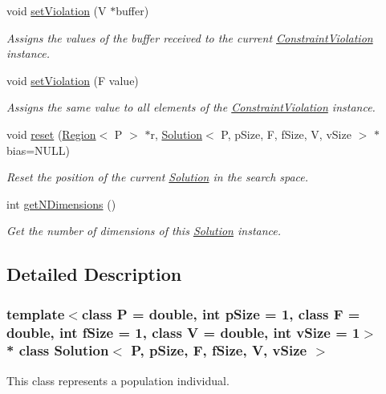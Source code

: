 \begin{DoxyCompactItemize}
void \hyperlink{classSolution_aad908f750b12ec590878684f042c23ce}{set\+Violation} (V $\ast$buffer)
\begin{DoxyCompactList}\small\item\em Assigns the values of the buffer received to the current \hyperlink{structConstraintViolation}{Constraint\+Violation} instance. \end{DoxyCompactList}\item 
void \hyperlink{classSolution_a8f2b530ec087ff9e62ef00300f6cb17e}{set\+Violation} (F value)
\begin{DoxyCompactList}\small\item\em Assigns the same value to all elements of the \hyperlink{structConstraintViolation}{Constraint\+Violation} instance. \end{DoxyCompactList}\item 
void \hyperlink{classSolution_a84c713b707a570add53e85a28196bb3e}{reset} (\hyperlink{classRegion}{Region}$<$ P $>$ $\ast$r, \hyperlink{classSolution}{Solution}$<$ P, p\+Size, F, f\+Size, V, v\+Size $>$ $\ast$bias=N\+U\+LL)
\begin{DoxyCompactList}\small\item\em Reset the position of the current \hyperlink{classSolution}{Solution} in the search space. \end{DoxyCompactList}\item 
int \hyperlink{classSolution_ad5b8c8ce272efaada80e93b0e097d1cd}{get\+N\+Dimensions} ()
\begin{DoxyCompactList}\small\item\em Get the number of dimensions of this \hyperlink{classSolution}{Solution} instance. \end{DoxyCompactList}\end{DoxyCompactItemize}


\subsection{Detailed Description}
\subsubsection*{template$<$class P = double, int p\+Size = 1, class F = double, int f\+Size = 1, class V = double, int v\+Size = 1$>$\\*
class Solution$<$ P, p\+Size, F, f\+Size, V, v\+Size $>$}

This class represents a population individual. 

